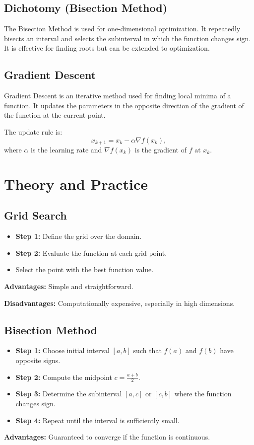 \documentclass[]{article}
\begin{document}
	\subsection*{Dichotomy (Bisection Method)}
	The Bisection Method is used for one-dimensional optimization. It repeatedly bisects an interval and selects the subinterval in which the function changes sign. It is effective for finding roots but can be extended to optimization.
	
	\subsection*{Gradient Descent}
	Gradient Descent is an iterative method used for finding local minima of a function. It updates the parameters in the opposite direction of the gradient of the function at the current point. 
	
	The update rule is:
	\[
	x_{k+1} = x_k - \alpha \nabla f(x_k),
	\]
	where $\alpha$ is the learning rate and $\nabla f(x_k)$ is the gradient of $f$ at $x_k$.
	
	\section*{Theory and Practice}
	\subsection*{Grid Search}
	\begin{itemize}
		\item \textbf{Step 1:} Define the grid over the domain.
		\item \textbf{Step 2:} Evaluate the function at each grid point.
		\item {} Select the point with the best function value.
	\end{itemize}
	\textbf{Advantages:} Simple and straightforward.
	
	\textbf{Disadvantages:} Computationally expensive, especially in high dimensions.
	
	\subsection*{Bisection Method}
	\begin{itemize}
		\item \textbf{Step 1:} Choose initial interval $[a, b]$ such that $f(a)$ and $f(b)$ have opposite signs.
		\item \textbf{Step 2:} Compute the midpoint $c = \frac{a+b}{2}$.
		\item \textbf{Step 3:} Determine the subinterval $[a, c]$ or $[c, b]$ where the function changes sign.
		\item \textbf{Step 4:} Repeat until the interval is sufficiently small.
	\end{itemize}
	\textbf{Advantages:} Guaranteed to converge if the function is continuous.
	
\end{document}
